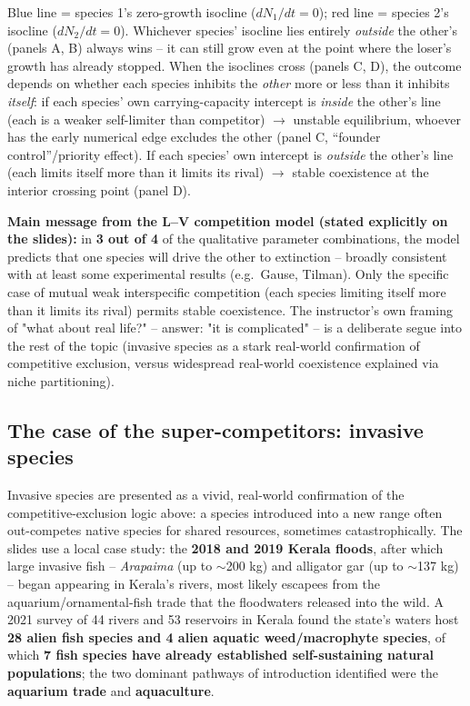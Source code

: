 \documentclass[11pt,a4paper]{article}
\begin{document}
\begin{figbox}[title={Lotka--Volterra competition: zero-growth isoclines and the four qualitative outcomes}]
\vspace{1mm}
\footnotesize Blue line = species 1's zero-growth isocline ($dN_1/dt=0$); red line = species 2's isocline ($dN_2/dt=0$). Whichever species' isocline lies entirely \emph{outside} the other's (panels A, B) always wins -- it can still grow even at the point where the loser's growth has already stopped. When the isoclines cross (panels C, D), the outcome depends on whether each species inhibits the \emph{other} more or less than it inhibits \emph{itself}: if each species' own carrying-capacity intercept is \emph{inside} the other's line (each is a weaker self-limiter than competitor) $\to$ unstable equilibrium, whoever has the early numerical edge excludes the other (panel C, ``founder control''/priority effect). If each species' own intercept is \emph{outside} the other's line (each limits itself more than it limits its rival) $\to$ stable coexistence at the interior crossing point (panel D).
\end{figbox}

\begin{exambox}
\textbf{Main message from the L--V competition model (stated explicitly on the slides):} in \textbf{3 out of 4} of the qualitative parameter combinations, the model predicts that one species will drive the other to extinction -- broadly consistent with at least some experimental results (e.g.\ Gause, Tilman). Only the specific case of mutual weak interspecific competition (each species limiting itself more than it limits its rival) permits stable coexistence. The instructor's own framing of "what about real life?" -- answer: "it is complicated" -- is a deliberate segue into the rest of the topic (invasive species as a stark real-world confirmation of competitive exclusion, versus widespread real-world coexistence explained via niche partitioning).
\end{exambox}

\subsection{The case of the super-competitors: invasive species}
Invasive species are presented as a vivid, real-world confirmation of the competitive-exclusion logic above: a species introduced into a new range often out-competes native species for shared resources, sometimes catastrophically. The slides use a local case study: the \textbf{2018 and 2019 Kerala floods}, after which large invasive fish -- \emph{Arapaima} (up to $\sim$200 kg) and alligator gar (up to $\sim$137 kg) -- began appearing in Kerala's rivers, most likely escapees from the aquarium/ornamental-fish trade that the floodwaters released into the wild. A 2021 survey of 44 rivers and 53 reservoirs in Kerala found the state's waters host \textbf{28 alien fish species and 4 alien aquatic weed/macrophyte species}, of which \textbf{7 fish species have already established self-sustaining natural populations}; the two dominant pathways of introduction identified were the \textbf{aquarium trade} and \textbf{aquaculture}.
\end{document}
